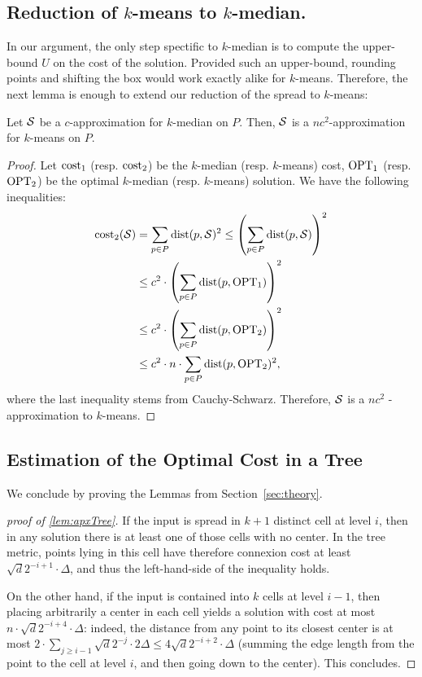 \subsection{Reduction of $k$-means to $k$-median.}
\label{app:redKM}
In our argument, the only step spectific to $k$-median is to compute the upper-bound $U$ on the cost of the solution. Provided such an upper-bound, rounding points and shifting the box would work exactly alike for $k$-means. Therefore, the next lemma is enough to extend our reduction of the spread to $k$-means:
\begin{lemma}\label{lem:kmedTokmeans}
Let $\mathcal S$ be a $c$-approximation for $k$-median on $P$. Then, $\mathcal S$ is a $nc^2$-approximation for $k$-means on $P$.
\end{lemma}
\begin{proof}
Let $\operatorname{cost}_1$ (resp. $\operatorname{cost}_2$) be the $k$-median (resp. $k$-means) cost, $\text{OPT}_1$ (resp. $\text{OPT}_2$) be the optimal $k$-median (resp. $k$-means) solution. We have the following inequalities:
\begin{align*}
\operatorname{cost}_2(\mathcal S) &= \sum_{p\in P} \operatorname{dist}(p, \mathcal S)^2 \leq \left( \sum_{p\in P} \operatorname{dist}(p, \mathcal S)\right)^2\\
&\leq c^2 \cdot \left(  \sum_{p\in P} \operatorname{dist}(p, \text{OPT}_1)\right)^2\\
&\leq c^2 \cdot \left(  \sum_{p\in P} \operatorname{dist}(p, \text{OPT}_2)\right)^2\\
&\leq c^2 \cdot n \cdot  \sum_{p\in P} \operatorname{dist}(p, \text{OPT}_2)^2,
\end{align*}
where the last inequality stems from Cauchy-Schwarz. Therefore, $\mathcal S$ is a $nc^2$ - approximation to $k$-means. 
\end{proof}

\subsection{Estimation of the Optimal Cost in a Tree}
\label{app:apx-tree-proof}

We conclude by proving the Lemmas from Section~\ref{sec:theory}.
\begin{proof}[proof of \cref{lem:apxTree}]
If the input is spread in $k+1$ distinct cell at level $i$, then in any solution there is at least one of those cells with no center. In the tree metric, points
lying in this cell have therefore connexion cost at least $\sqrt{d}2^{-i+1} \cdot \Delta$, and thus the left-hand-side of the inequality holds.

On the other hand, if the input is contained into $k$ cells at level $i-1$, then placing arbitrarily a center in each cell yields a solution with cost at most
$n \cdot \sqrt{d}2^{-i+4} \cdot \Delta$: indeed, the distance from any point to its closest center is at most $2 \cdot \sum_{j \geq i-1} \sqrt{d}2^{-j} \cdot
2\Delta \leq 4 \sqrt{d}2^{-i+2} \cdot \Delta$ (summing the edge length from the point to the cell at level $i$, and then going down to the center). This
concludes.
\end{proof}


